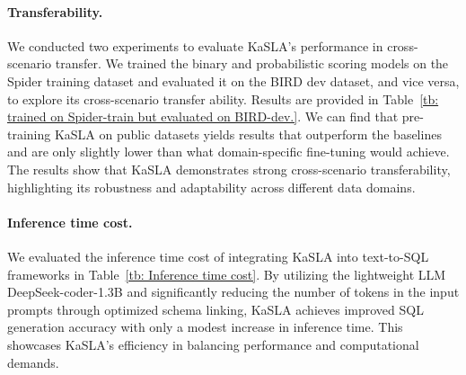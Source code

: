 \paragraph{Transferability.}\label{sec: Transferability of KaSLA}
We conducted two experiments to evaluate KaSLA's performance in cross-scenario transfer. We trained the binary and probabilistic scoring models on the Spider training dataset and evaluated it on the BIRD dev dataset, and vice versa, to explore its cross-scenario transfer ability. Results are provided in Table~\ref{tb: trained on Spider-train but evaluated on BIRD-dev.}. We can find that pre-training KaSLA on public datasets yields results that outperform the baselines and are only slightly lower than what domain-specific fine-tuning would achieve. The results show that KaSLA demonstrates strong cross-scenario transferability, highlighting its robustness and adaptability across different data domains.

\paragraph{Inference time cost.}
We evaluated the inference time cost of integrating KaSLA into text-to-SQL frameworks in Table~\ref{tb: Inference time cost}. By utilizing the lightweight LLM DeepSeek-coder-1.3B and significantly reducing the number of tokens in the input prompts through optimized schema linking, KaSLA achieves improved SQL generation accuracy with only a modest increase in inference time. This showcases KaSLA's efficiency in balancing performance and computational demands.